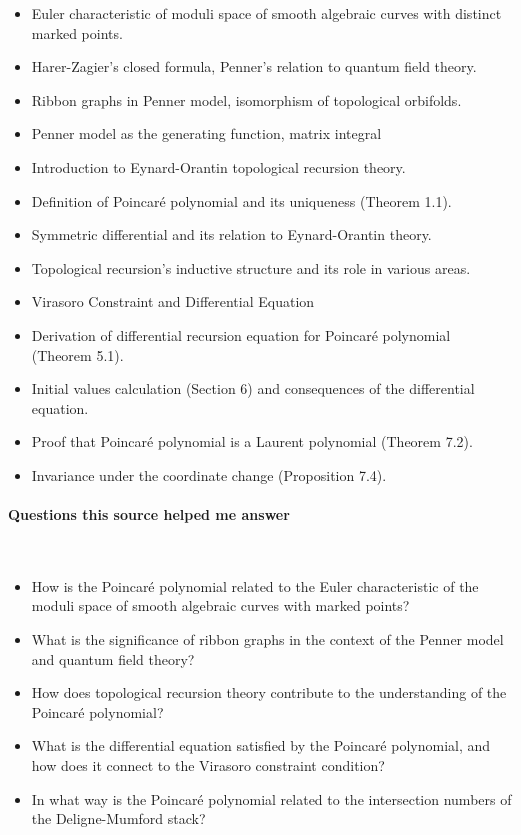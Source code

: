 \begin{itemize}
    \item Euler characteristic of moduli space of smooth algebraic curves with distinct marked points.
    \item Harer-Zagier's closed formula, Penner's relation to quantum field theory.
    \item Ribbon graphs in Penner model, isomorphism of topological orbifolds.
    \item Penner model as the generating function, matrix integral 
    \item Introduction to Eynard-Orantin topological recursion theory.
    \item Definition of Poincaré polynomial and its uniqueness (Theorem 1.1).
    \item Symmetric differential and its relation to Eynard-Orantin theory.
    \item Topological recursion's inductive structure and its role in various areas.
    \item Virasoro Constraint and Differential Equation
    \item Derivation of differential recursion equation for Poincaré polynomial (Theorem 5.1).
    \item Initial values calculation (Section 6) and consequences of the differential equation.
    \item Proof that Poincaré polynomial is a Laurent polynomial (Theorem 7.2).
    \item Invariance under the coordinate change (Proposition 7.4).
\end{itemize}
    
\vspace*{-0.5cm}
\paragraph{Questions this source helped me answer} \

\begin{itemize}
    \item How is the Poincaré polynomial related to the Euler characteristic of the moduli space of smooth algebraic curves with marked points?
    \item What is the significance of ribbon graphs in the context of the Penner model and quantum field theory?
    \item How does topological recursion theory contribute to the understanding of the Poincaré polynomial?
    \item What is the differential equation satisfied by the Poincaré polynomial, and how does it connect to the Virasoro constraint condition?
    \item In what way is the Poincaré polynomial related to the intersection numbers of the Deligne-Mumford stack?
\end{itemize}

